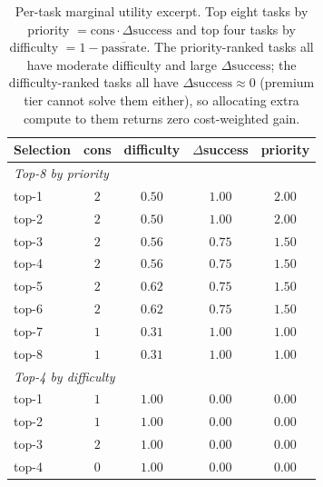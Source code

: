 \documentclass{article}
\begin{document}
\begin{table}[h]
\centering
\caption{Per-task marginal utility excerpt. Top eight tasks by
priority $= \mathrm{cons}\cdot\Delta\mathrm{success}$ and top four
tasks by difficulty $= 1 - \overline{\mathrm{passrate}}$. The
priority-ranked tasks all have moderate difficulty and large
$\Delta\mathrm{success}$; the difficulty-ranked tasks all have
$\Delta\mathrm{success} \approx 0$ (premium tier cannot solve them
either), so allocating extra compute to them returns zero
cost-weighted gain.}
\label{tab:marg}
\small
\begin{tabular}{lcccc}
\toprule
Selection & cons & difficulty & $\Delta$success & priority \\
\midrule
\multicolumn{5}{l}{\textit{Top-8 by priority}} \\
top-1 & $2$ & $0.50$ & $1.00$ & $2.00$ \\
top-2 & $2$ & $0.50$ & $1.00$ & $2.00$ \\
top-3 & $2$ & $0.56$ & $0.75$ & $1.50$ \\
top-4 & $2$ & $0.56$ & $0.75$ & $1.50$ \\
top-5 & $2$ & $0.62$ & $0.75$ & $1.50$ \\
top-6 & $2$ & $0.62$ & $0.75$ & $1.50$ \\
top-7 & $1$ & $0.31$ & $1.00$ & $1.00$ \\
top-8 & $1$ & $0.31$ & $1.00$ & $1.00$ \\
\midrule
\multicolumn{5}{l}{\textit{Top-4 by difficulty}} \\
top-1 & $1$ & $1.00$ & $0.00$ & $0.00$ \\
top-2 & $1$ & $1.00$ & $0.00$ & $0.00$ \\
top-3 & $2$ & $1.00$ & $0.00$ & $0.00$ \\
top-4 & $0$ & $1.00$ & $0.00$ & $0.00$ \\
\bottomrule
\end{tabular}
\end{table}
\end{document}
